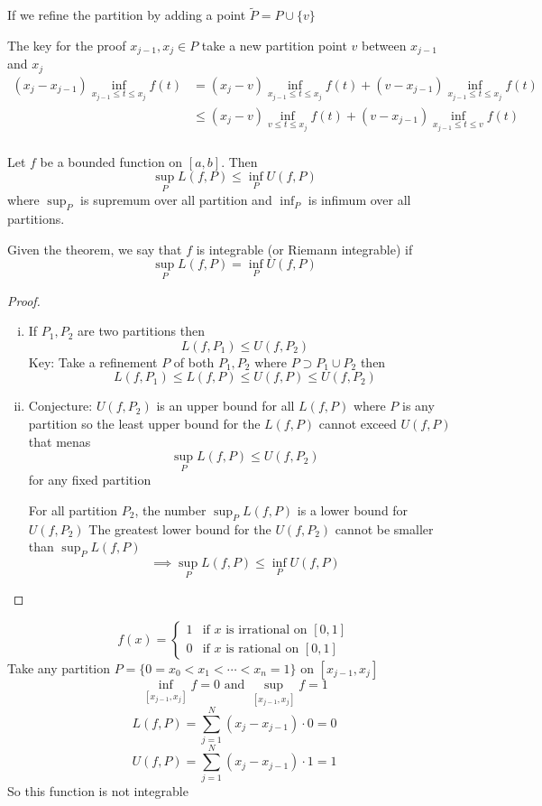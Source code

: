 If we refine the partition by adding a point $\tilde{P} = P \cup \{v\}$

The key for the proof $x_{j-1}, x_j \in P$ take a new partition point $v$ between $x_{j-1}$ and $x_j$
\begin{align*}
  (x_j - x_{j-1}) \inf_{x_{j-1} \leq t \leq x_j} f(t) &= (x_j - v) \inf_{x_{j-1} \leq t \leq x_j} f(t) + (v - x_{j-1}) \inf_{x_{j-1} \leq t \leq x_j} f(t) \\
  &\leq (x_j - v) \inf_{v \leq t \leq x_j} f(t) + (v - x_{j-1}) \inf_{x_{j-1} \leq t \leq v} f(t) \\
\end{align*}

\begin{theorem*}
  Let $f$ be a bounded function on $[a, b]$. Then
  $$\sup_{P} L(f, P) \leq \inf_{P} U(f, P)$$
  where $\sup_{P}$ is supremum over all partition and $\inf_{P}$ is infimum over all partitions.
\end{theorem*}

\begin{definition*}
  Given the theorem, we say that $f$ is integrable (or Riemann integrable) if
  $$\sup_{P} L(f, P) = \inf_{P} U(f, P)$$
\end{definition*}

\begin{proof}
  \text{}
  \begin{enumerate}[(i)]
    \item If $P_1, P_2$ are two partitions then 
    $$L(f, P_1) \leq U(f, P_2)$$
    Key: Take a refinement $P$ of both $P_1, P_2$ where $P \supset P_1 \cup P_2$ then 
    $$L(f, P_1) \leq L(f, P) \leq U(f, P) \leq U(f, P_2)$$
    \item Conjecture: $U(f, P_2)$ is an upper bound for all $L(f, P)$ where $P$ is any partition
    so the least upper bound for the $L(f, P)$ cannot exceed $U(f, P)$ that menas 
    $$\sup_P L(f, P) \leq U(f, P_2)$$
    for any fixed partition

    For all partition $P_2$, the number $\displaystyle\sup_P L(f, P)$ is a lower bound for $U(f, P_2)$
    The greatest lower bound for the $U(f, P_2)$ cannot be smaller than $\displaystyle\sup_P L(f, P)$
    $$\implies \sup_P L(f, P) \leq \inf_P U(f, P)$$
  \end{enumerate}
\end{proof}

\begin{example*}
\[
  f(x) = \begin{cases}
    1 & \text{if } x \text{ is irrational on } [0, 1] \\
    0 & \text{if } x \text{ is rational on } [0, 1]
    \end{cases}
\]
Take any partition $P =\{0 = x_0 < x_1 < \cdots < x_n = 1\}$ on $[x_{j-1}, x_j]$
$$\inf_{[x_{j-1}, x_j]}f = 0\text{ and }\sup_{[x_{j-1}, x_j]}f = 1$$
$$L(f, P) = \sum_{j=1}^{N} (x_j - x_{j-1}) \cdot 0 = 0$$
$$U(f, P) = \sum_{j=1}^{N} (x_j - x_{j-1}) \cdot 1 = 1$$
So this function is not integrable
\end{example*} 

